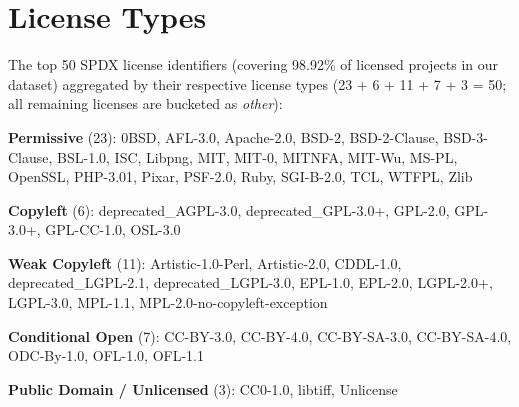 \section{License Types}\label{ap:type}
The top 50 SPDX license identifiers (covering 98.92\% of licensed projects
in our dataset) aggregated by their respective license types
(23 + 6 + 11 + 7 + 3 = 50; all remaining licenses are bucketed as
\emph{other}):

\textbf{Permissive} (23): 0BSD, AFL-3.0, Apache-2.0, BSD-2, BSD-2-Clause,
BSD-3-Clause, BSL-1.0, ISC, Libpng, MIT, MIT-0, MITNFA, MIT-Wu, MS-PL,
OpenSSL, PHP-3.01, Pixar, PSF-2.0, Ruby, SGI-B-2.0, TCL, WTFPL, Zlib

\textbf{Copyleft} (6): deprecated\_AGPL-3.0, deprecated\_GPL-3.0+, GPL-2.0,
GPL-3.0+, GPL-CC-1.0, OSL-3.0

\textbf{Weak Copyleft} (11): Artistic-1.0-Perl, Artistic-2.0, CDDL-1.0,
deprecated\_LGPL-2.1, deprecated\_LGPL-3.0, EPL-1.0, EPL-2.0, LGPL-2.0+,
LGPL-3.0, MPL-1.1, MPL-2.0-no-copyleft-exception

\textbf{Conditional Open} (7): CC-BY-3.0, CC-BY-4.0, CC-BY-SA-3.0,
CC-BY-SA-4.0, ODC-By-1.0, OFL-1.0, OFL-1.1

\textbf{Public Domain / Unlicensed} (3): CC0-1.0, libtiff, Unlicense
